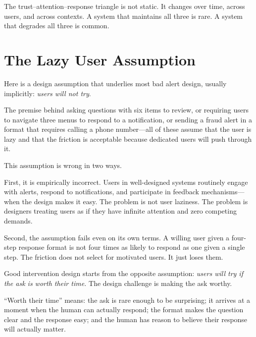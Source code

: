 The trust--attention--response triangle is not static. It changes over time, across users, and across contexts. A system that maintains all three is rare. A system that degrades all three is common.

\section{The Lazy User Assumption}
\label{sec:ch05-lazy-user}

Here is a design assumption that underlies most bad alert design, usually implicitly: \emph{users will not try}.

The premise behind asking questions with six items to review, or requiring users to navigate three menus to respond to a notification, or sending a fraud alert in a format that requires calling a phone number---all of these assume that the user is lazy and that the friction is acceptable because dedicated users will push through it.

This assumption is wrong in two ways.

First, it is empirically incorrect. Users in well-designed systems routinely engage with alerts, respond to notifications, and participate in feedback mechanisms---when the design makes it easy. The problem is not user laziness. The problem is designers treating users as if they have infinite attention and zero competing demands.

Second, the assumption fails even on its own terms. A willing user given a four-step response format is not four times as likely to respond as one given a single step. The friction does not select for motivated users. It just loses them.

\begin{keyconcept}
Good \hitl intervention design starts from the opposite assumption: \emph{users will try if the ask is worth their time.} The design challenge is making the ask worthy.

``Worth their time'' means: the ask is rare enough to be surprising; it arrives at a moment when the human can actually respond; the format makes the question clear and the response easy; and the human has reason to believe their response will actually matter.
\end{keyconcept}

